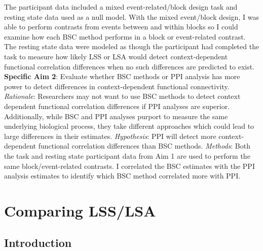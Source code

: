 \documentclass[phd,appendix,figures]{uithesis}
\begin{document}
The participant data included a mixed event-related/block design task and resting
state data used as a null model.
With the mixed event/block design, I was able to perform contrasts from events
between and within blocks so I could examine how each BSC method performs
in a block or event-related contrast.
The resting state data were modeled as though the participant had completed the task
to measure how likely LSS or LSA would detect context-dependent functional correlation
differences when no such differences are predicted to exist.
\newline
\newline
\textbf{Specific Aim 2}: Evaluate whether BSC methods or PPI analysis has
more power to detect differences in context-dependent functional connectivity.
\newline
\newline
\textit{Rationale}: Researchers may not want to use BSC methods
to detect context dependent functional correlation differences if
PPI analyses are superior.
Additionally, while BSC and PPI analyses purport to measure the same underlying
biological process, they take different approaches which could lead to large differences
in their estimates.
\newline
\newline
\textit{Hypothesis}:
PPI will detect more context-dependent functional correlation differences than BSC methods.
\newline
\newline
\textit{Methods}:
Both the task and resting state participant data from Aim 1 are used to perform
the same block/event-related contrasts.
I correlated the BSC estimates with the PPI analysis estimates to identify which BSC method
correlated more with PPI.


\chapter{Comparing LSS/LSA}

\section{Introduction}
\label{intro}
\end{document}
